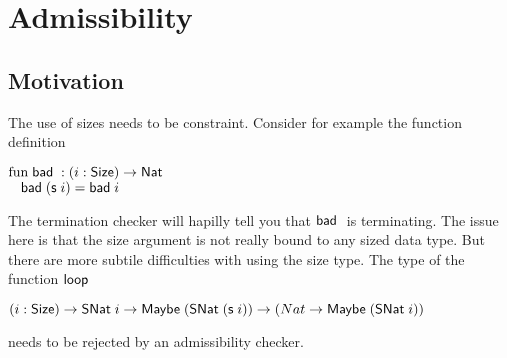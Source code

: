 \section{Admissibility}
\subsection{Motivation}
The use of sizes needs to be constraint.
Consider for example the function definition

\begin{bsp}
$\mathrm{fun}\; \mathsf{bad}\; : ( i : \mathsf{Size} ) \rightarrow{\mathsf{Nat}\;}$\\
$\hspace*{3mm} \mathsf{bad}\; (\mathsf{s}\; i) = \mathsf{bad}\; i $ 
\end{bsp}
The termination checker will hapilly tell you that $\mathsf{bad}\;$ is terminating.
The issue here is that the size argument is not really bound to any sized data type.
But there are more subtile difficulties with using the size type.
The type of the function $\mathsf{loop}\;$
\begin{bsp}
$( i : \mathsf{Size} ) \rightarrow{\mathsf{SNat}\;i \rightarrow\mathsf{Maybe}\;(\mathsf{SNat}\;(\mathsf{s}\;i)) \rightarrow(Nat \rightarrow\mathsf{Maybe}\;(\mathsf{SNat}\;i))} $ 
\end{bsp}
needs to be rejected by an admissibility checker.
